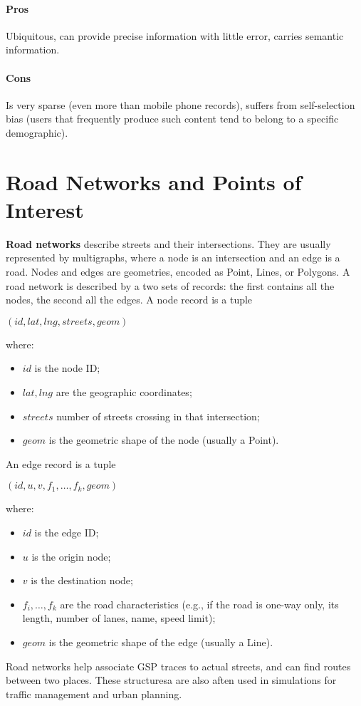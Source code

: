 \paragraph{Pros}
Ubiquitous, can provide precise information with little error, carries semantic information.

\paragraph{Cons}
Is very sparse (even more than mobile phone records), suffers from self-selection bias (users that frequently produce such content tend to belong to a specific demographic).

\section{Road Networks and Points of Interest}

\textbf{Road networks} describe streets and their intersections. They are usually represented by multigraphs, where a node is an intersection and an edge is a road. Nodes and edges are geometries, encoded as Point, Lines, or Polygons. A road network is described by a two sets of records: the first contains all the nodes, the second all the edges. A node record is a tuple
\begin{center}
    $(id, lat, lng, streets, geom)$
\end{center}
where:
\begin{itemize}[itemsep=-5pt, label=-]
    \item $id$ is the node ID;
    \item $lat, lng$ are the geographic coordinates;
    \item $streets$ number of streets crossing in that intersection;
    \item $geom$ is the geometric shape of the node (usually a Point).
\end{itemize}
An edge record is a tuple
\begin{center}
    $(id, u, v, f_1, \dots, f_k, geom)$
\end{center}
where:
\begin{itemize}[itemsep=-5pt, label=-]
    \item $id$ is the edge ID;
    \item $u$ is the origin node;
    \item $v$ is the destination node;
    \item $f_i, \dots, f_k$ are the road characteristics (e.g., if the road is one-way only, its length, number of lanes, name, speed limit);
    \item $geom$ is the geometric shape of the edge (usually a Line).
\end{itemize}
Road networks help associate GSP traces to actual streets, and can find routes between two places. These structuresa are also aften used in simulations for traffic management and urban planning.

